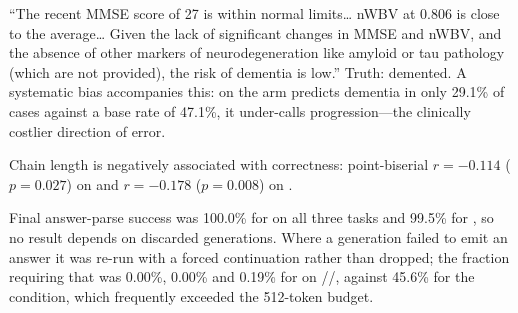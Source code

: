  ``The recent MMSE score of 27 is within normal
limits\ldots{} nWBV at 0.806 is close to the average\ldots{} Given the lack of significant changes
in MMSE and nWBV, and the absence of other markers of neurodegeneration like amyloid or tau
pathology (which are not provided), the risk of dementia is low.'' Truth: demented. A systematic
bias accompanies this: on \taskthree the \cotarm arm predicts dementia in only 29.1\% of cases against
a base rate of 47.1\%, \ie it under-calls progression---the clinically costlier direction of error.

 Chain length is negatively associated with
correctness: point-biserial $r = -0.114$ ($p = 0.027$) on \taskone and $r = -0.178$ ($p = 0.008$) on
\taskthree.

 Final answer-parse success was 100.0\% for \qwenseven on all three tasks
and 99.5\% for \qwensmall, so no result depends on discarded generations. Where a generation failed
to emit an answer it was re-run with a forced continuation rather than dropped; the fraction
requiring that was 0.00\%, 0.00\% and 0.19\% for \qwenseven on \taskone/\tasktwo/\taskthree, against
45.6\% for the \qwensmall \cotarm condition, which frequently exceeded the 512-token budget.

